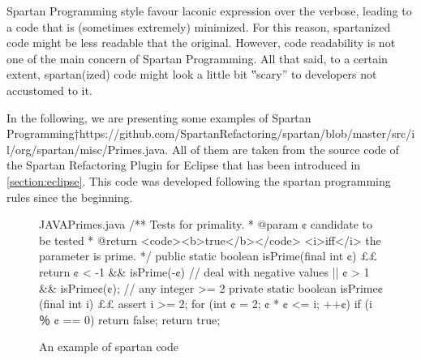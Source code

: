 Spartan Programming style favour laconic expression over the verbose, leading
to a code that is (sometimes extremely) minimized. For this reason, spartanized
code might be less readable that the original. However, code readability is not
one of the main concern of Spartan Programming. All that said, to a certain
extent, spartan(ized) code might look a little bit ‟scary” to developers not
accustomed to it.

In the following, we are presenting some examples of Spartan
Programming†{https://github.com/SpartanRefactoring/spartan/blob/master/src/il/org/spartan/misc/Primes.java}.
All of them are taken from the source code of the Spartan Refactoring Plugin
for Eclipse that has been introduced in \cref{section:eclipse}. This code was
developed following the spartan programming rules since the beginning.



%
%
\begin{figure}[h]
\label{figure:shock-2}
\caption{An example of spartan code}
\begin{Code}{JAVA}{Primes.java}
/** Tests for primality.
  * @param ¢ candidate to be tested
  * @return <code><b>true</b></code> <i>iff</i> the parameter is prime. */
public static boolean isPrime(final int ¢) {££
  return ¢ < -1 && isPrime(-¢) // deal with negative values
      || ¢ > 1 && isPrime¢(¢); // any integer >= 2
}
private static boolean isPrime¢(final int i) {££
  assert i >= 2;
  for (int ¢ = 2; ¢ * ¢ <= i; ++¢)
    if (i ％ ¢ == 0)
      return false;
  return true;
}
\end{Code}
\end{figure}

